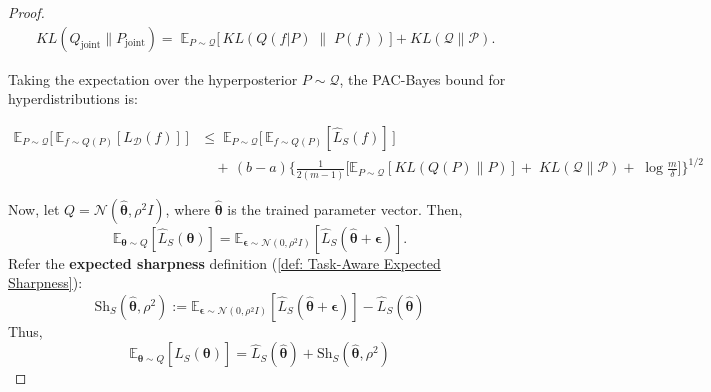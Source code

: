 \documentclass[letterpaper]{article} %
\begin{document}
\begin{proof}
\begin{align}
& KL(Q_\text{joint} \| P_\text{joint})  =\; 
\mathbb{E}_{P \sim \mathcal{Q}} \big[\, KL(Q(f|P)\;\|\;P(f))\, \big] 
+ KL(\mathcal{Q} \| \mathcal{P}).
\end{align}



Taking the expectation over the hyperposterior $P \sim \mathcal{Q}$, the PAC-Bayes bound for hyperdistributions is:





\begin{equation}
\begin{aligned}
    \mathbb{E}_{P \sim \mathcal{Q}} \Big[\, \mathbb{E}_{f \sim Q(P)} [L_{\mathcal{D}}(f)] \,\Big] 
    & \leq\; \mathbb{E}_{P \sim \mathcal{Q}} \Big[\, \mathbb{E}_{f \sim Q(P)} [\hat{L}_{S}(f)] \,\Big] \\
    &\quad +\, (b-a)\Bigg\{
        \frac{1}{2(m-1)} \bigg[
            \mathbb{E}_{P \sim \mathcal{Q}}\left[ KL(Q(P)\|P) \right] 
            +\; KL(\mathcal{Q}\|\mathcal{P}) 
            +\; \log \frac{m}{\delta}
        \bigg]
    \Bigg\}^{1/2}
\end{aligned}
\end{equation}


Now, let $Q = \mathcal{N}(\hat{\boldsymbol{\theta}}, \rho^2 I)$, where $\hat{\boldsymbol{\theta}}$ is the trained parameter vector. Then,
$$\mathbb{E}_{\boldsymbol{\theta} \sim Q}[\hat{L}_S(\boldsymbol{\theta})] = \mathbb{E}_{\boldsymbol{\epsilon} \sim \mathcal{N}(0, \rho^2 I)}[\hat{L}_S(\hat{\boldsymbol{\theta}} + \boldsymbol{\epsilon})].$$
Refer the \textbf{expected sharpness} definition (\ref{def: Task-Aware Expected Sharpness}):
$$\mathrm{Sh}_S(\hat{\boldsymbol{\theta}}, \rho^2) := \mathbb{E}_{\boldsymbol{\epsilon} \sim \mathcal{N}(0, \rho^2 I)}\left[ \hat{L}_S(\hat{\boldsymbol{\theta}} + \boldsymbol{\epsilon}) \right] - \hat{L}_S(\hat{\boldsymbol{\theta}})$$
Thus,
$$\mathbb{E}_{\boldsymbol{\theta} \sim Q}[\hat{L}_S(\boldsymbol{\theta})] = \hat{L}_S(\hat{\boldsymbol{\theta}}) + \mathrm{Sh}_S(\hat{\boldsymbol{\theta}}, \rho^2)$$


\end{proof}
\end{document}
